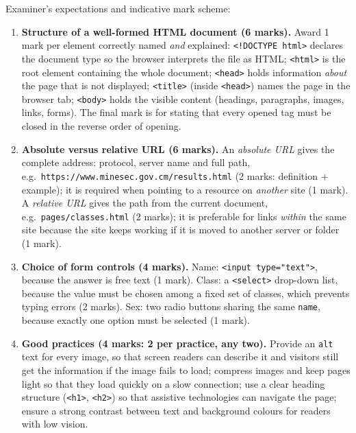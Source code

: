 \documentclass[11pt]{article}
\begin{document}
\begin{corrige}
Examiner's expectations and indicative mark scheme:
\begin{enumerate}
\item \textbf{Structure of a well-formed HTML document (6 marks).} Award 1 mark per element correctly named \emph{and} explained: \texttt{<!DOCTYPE html>} declares the document type so the browser interprets the file as HTML; \texttt{<html>} is the root element containing the whole document; \texttt{<head>} holds information \emph{about} the page that is not displayed; \texttt{<title>} (inside \texttt{<head>}) names the page in the browser tab; \texttt{<body>} holds the visible content (headings, paragraphs, images, links, forms). The final mark is for stating that every opened tag must be closed in the reverse order of opening.
\item \textbf{Absolute versus relative URL (6 marks).} An \emph{absolute URL} gives the complete address: protocol, server name and full path, e.g.\ \texttt{https://www.minesec.gov.cm/results.html} (2 marks: definition + example); it is required when pointing to a resource on \emph{another} site (1 mark). A \emph{relative URL} gives the path from the current document, e.g.\ \texttt{pages/classes.html} (2 marks); it is preferable for links \emph{within} the same site because the site keeps working if it is moved to another server or folder (1 mark).
\item \textbf{Choice of form controls (4 marks).} Name: \texttt{<input type="text">}, because the answer is free text (1 mark). Class: a \texttt{<select>} drop-down list, because the value must be chosen among a fixed set of classes, which prevents typing errors (2 marks). Sex: two radio buttons sharing the same \texttt{name}, because exactly one option must be selected (1 mark).
\item \textbf{Good practices (4 marks: 2 per practice, any two).} Provide an \texttt{alt} text for every image, so that screen readers can describe it and visitors still get the information if the image fails to load; compress images and keep pages light so that they load quickly on a slow connection; use a clear heading structure (\texttt{<h1>}, \texttt{<h2>}) so that assistive technologies can navigate the page; ensure a strong contrast between text and background colours for readers with low vision.
\end{enumerate}
\end{corrige}
\end{document}
